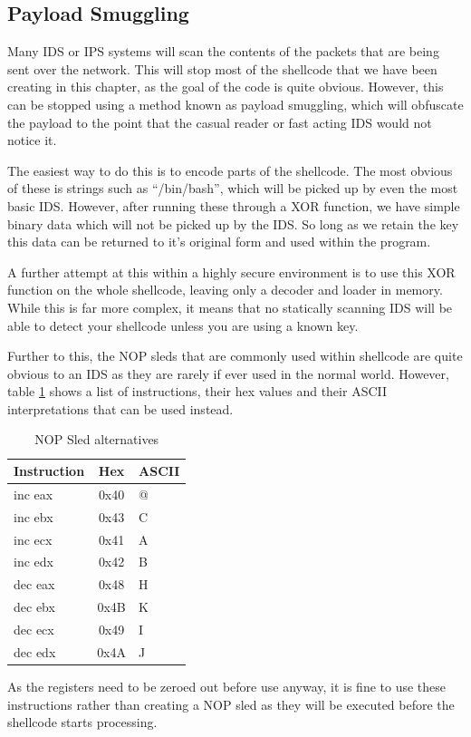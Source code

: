 \documentclass[a4paper,11pt]{report}
\begin{document}
		\subsection{Payload Smuggling}
			Many IDS or IPS systems will scan the contents of the packets that are being sent over the network. 
			This will stop most of the shellcode that we have been creating in this chapter, as the goal of the code is quite obvious. 
			However, this can be stopped using a method known as payload smuggling, which will obfuscate the payload to the point that the casual reader or fast acting IDS would not notice it. 

			The easiest way to do this is to encode parts of the shellcode. 
			The most obvious of these is strings such as ``/bin/bash'', which will be picked up by even the most basic IDS. 
			However, after running these through a XOR function, we have simple binary data which will not be picked up by the IDS. 
			So long as we retain the key this data can be returned to it's original form and used within the program. 

			A further attempt at this within a highly secure environment is to use this XOR function on the whole shellcode, leaving only a decoder and loader in memory. 
			While this is far more complex, it means that no statically scanning IDS will be able to detect your shellcode unless you are using a known key. 

			Further to this, the NOP sleds that are commonly used within shellcode are quite obvious to an IDS as they are rarely if ever used in the normal world. 
			However, table \ref{tab:NOPAlternatives} shows a list of instructions, their hex values and their ASCII interpretations that can be used instead. 
			\begin{table}[htb]
				\centering
				\begin{tabular}{| l | c | l |}
					\hline
					\textbf{Instruction} & \textbf{Hex} & \textbf{ASCII} \\ \hline
					inc eax	& 0x40 & @ \\ \hline
					inc ebx & 0x43 & C \\ \hline
					inc ecx & 0x41 & A \\ \hline
					inc edx & 0x42 & B \\ \hline
					dec eax & 0x48 & H \\ \hline
					dec ebx & 0x4B & K \\ \hline
					dec ecx & 0x49 & I \\ \hline
					dec edx & 0x4A & J \\ \hline
				\end{tabular}
				\caption{NOP Sled alternatives}
				\label{tab:NOPAlternatives}
			\end{table}
			As the registers need to be zeroed out before use anyway, it is fine to use these instructions rather than creating a NOP sled as they will be executed before the shellcode starts processing.  
\end{document}
